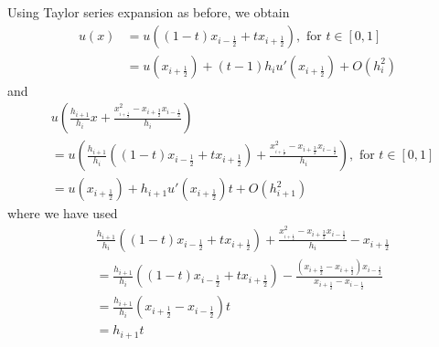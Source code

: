 \documentclass[a4paper]{article}
\numberwithin{equation}{section}
\begin{document}
Using Taylor series expansion as before, we obtain
\begin{align}
\label{1.50}
u\left( x \right) &= u\left( {\left( {1 - t} \right){x_{i - \frac{1}{2}}} + t{x_{i + \frac{1}{2}}}} \right),\mbox{ for } t \in \left[ {0,1} \right]\\
&= u\left( {{x_{i + \frac{1}{2}}}} \right) + \left( {t - 1} \right){h_i}u'\left( {{x_{i + \frac{1}{2}}}} \right) + O\left( {h_i^2} \right)
\end{align}
and
\begin{align}
&u\left( {\frac{{{h_{i + 1}}}}{{{h_i}}}x + \frac{{x_{_{i + \frac{1}{2}}}^2 - {x_{i + \frac{3}{2}}}{x_{i - \frac{1}{2}}}}}{{{h_i}}}} \right)\\
 &= u\left( {\frac{{{h_{i + 1}}}}{{{h_i}}}\left( {\left( {1 - t} \right){x_{i - \frac{1}{2}}} + t{x_{i + \frac{1}{2}}}} \right) + \frac{{x_{_{i + \frac{1}{2}}}^2 - {x_{i + \frac{3}{2}}}{x_{i - \frac{1}{2}}}}}{{{h_i}}}} \right),\mbox{ for } t \in \left[ {0,1} \right]\\
& = u\left( {{x_{i + \frac{1}{2}}}} \right) + {h_{i + 1}}u'\left( {{x_{i + \frac{1}{2}}}} \right)t + O\left( {h_{i + 1}^2} \right) \label{1.54}
\end{align}
where we have used
\begin{align}
&\frac{{{h_{i + 1}}}}{{{h_i}}}\left( {\left( {1 - t} \right){x_{i - \frac{1}{2}}} + t{x_{i + \frac{1}{2}}}} \right) + \frac{{x_{_{i + \frac{1}{2}}}^2 - {x_{i + \frac{3}{2}}}{x_{i - \frac{1}{2}}}}}{{{h_i}}} - {x_{i + \frac{1}{2}}}\\
 &= \frac{{{h_{i + 1}}}}{{{h_i}}}\left( {\left( {1 - t} \right){x_{i - \frac{1}{2}}} + t{x_{i + \frac{1}{2}}}} \right) - \frac{{\left( {{x_{i + \frac{3}{2}}} - {x_{i + \frac{1}{2}}}} \right){x_{i - \frac{1}{2}}}}}{{{x_{i + \frac{1}{2}}} - {x_{i - \frac{1}{2}}}}}\\
 &= \frac{{{h_{i + 1}}}}{{{h_i}}}\left( {{x_{i + \frac{1}{2}}} - {x_{i - \frac{1}{2}}}} \right)t\\
 &= {h_{i + 1}}t
\end{align}
\end{document}
